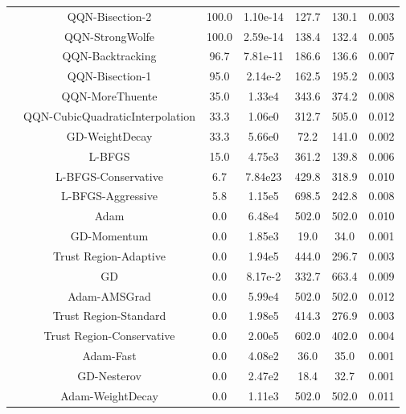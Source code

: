 \documentclass{article}
\begin{document}
\begin{table}[htbp]
{\begin{tabular}{l*{6}{S[table-format=2.2e-1]}}
 & QQN-Bisection-2 & 100.0 & 1.10e-14 & 127.7 & 130.1 & 0.003 \\
 & QQN-StrongWolfe & 100.0 & 2.59e-14 & 138.4 & 132.4 & 0.005 \\
 & QQN-Backtracking & 96.7 & 7.81e-11 & 186.6 & 136.6 & 0.007 \\
 & QQN-Bisection-1 & 95.0 & 2.14e-2 & 162.5 & 195.2 & 0.003 \\
 & QQN-MoreThuente & 35.0 & 1.33e4 & 343.6 & 374.2 & 0.008 \\
 & QQN-CubicQuadraticInterpolation & 33.3 & 1.06e0 & 312.7 & 505.0 & 0.012 \\
 & GD-WeightDecay & 33.3 & 5.66e0 & 72.2 & 141.0 & 0.002 \\
 & L-BFGS & 15.0 & 4.75e3 & 361.2 & 139.8 & 0.006 \\
 & L-BFGS-Conservative & 6.7 & 7.84e23 & 429.8 & 318.9 & 0.010 \\
 & L-BFGS-Aggressive & 5.8 & 1.15e5 & 698.5 & 242.8 & 0.008 \\
 & Adam & 0.0 & 6.48e4 & 502.0 & 502.0 & 0.010 \\
 & GD-Momentum & 0.0 & 1.85e3 & 19.0 & 34.0 & 0.001 \\
 & Trust Region-Adaptive & 0.0 & 1.94e5 & 444.0 & 296.7 & 0.003 \\
 & GD & 0.0 & 8.17e-2 & 332.7 & 663.4 & 0.009 \\
 & Adam-AMSGrad & 0.0 & 5.99e4 & 502.0 & 502.0 & 0.012 \\
 & Trust Region-Standard & 0.0 & 1.98e5 & 414.3 & 276.9 & 0.003 \\
 & Trust Region-Conservative & 0.0 & 2.00e5 & 602.0 & 402.0 & 0.004 \\
 & Adam-Fast & 0.0 & 4.08e2 & 36.0 & 35.0 & 0.001 \\
 & GD-Nesterov & 0.0 & 2.47e2 & 18.4 & 32.7 & 0.001 \\
 & Adam-WeightDecay & 0.0 & 1.11e3 & 502.0 & 502.0 & 0.011 \\
\midrule
\bottomrule
\end{tabular}
}
\end{table}
\end{document}
